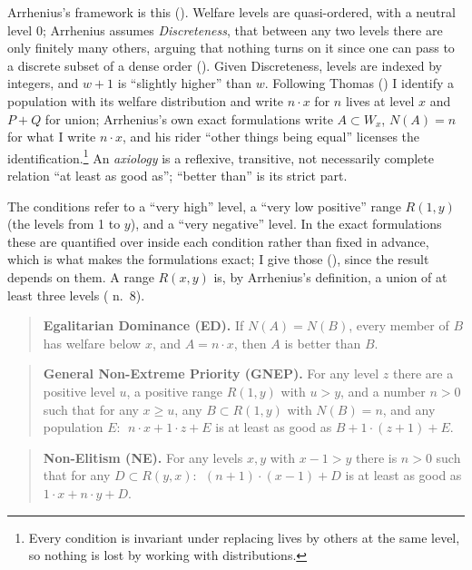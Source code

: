 \documentclass[
  11pt,
  letterpaper,
  DIV=11,
  numbers=noendperiod,
  twoside]{scrartcl}
\begin{document}
Arrhenius's framework is this (). Welfare levels are quasi-ordered, with a neutral level 0;
Arrhenius assumes \emph{Discreteness}, that between any two levels there
are only finitely many others, arguing that nothing turns on it since
one can pass to a discrete subset of a dense order
(). Given Discreteness,
levels are indexed by integers, and \(w+1\) is ``slightly higher'' than
\(w\). Following Thomas () I identify a
population with its welfare distribution and write \(n \cdot x\) for
\(n\) lives at level \(x\) and \(P + Q\) for union; Arrhenius's own
exact formulations write \(A \subset W_x\), \(N(A) = n\) for what I
write \(n \cdot x\), and his rider ``other things being equal'' licenses
the identification.\footnote{Every condition is invariant under
  replacing lives by others at the same level, so nothing is lost by
  working with distributions.} An \emph{axiology} is a reflexive,
transitive, not necessarily complete relation ``at least as good as'';
``better than'' is its strict part.

The conditions refer to a ``very high'' level, a ``very low positive''
range \(R(1,y)\) (the levels from 1 to \(y\)), and a ``very negative''
level. In the exact formulations these are quantified over inside each
condition rather than fixed in advance, which is what makes the
formulations exact; I give those (), since the result depends on them. A range \(R(x,y)\) is,
by Arrhenius's definition, a union of at least three levels
( n.~8).

\begin{quote}
\textbf{Egalitarian Dominance (ED).} If \(N(A) = N(B)\), every member of
\(B\) has welfare below \(x\), and \(A = n \cdot x\), then \(A\) is
better than \(B\).
\end{quote}

\begin{quote}
\textbf{General Non-Extreme Priority (GNEP).} For any level \(z\) there
are a positive level \(u\), a positive range \(R(1,y)\) with \(u > y\),
and a number \(n > 0\) such that for any \(x \geq u\), any
\(B \subset R(1,y)\) with \(N(B) = n\), and any population \(E\):
\(\;n \cdot x + 1\cdot z + E\) is at least as good as
\(B + 1 \cdot (z+1) + E\).
\end{quote}

\begin{quote}
\textbf{Non-Elitism (NE).} For any levels \(x, y\) with \(x - 1 > y\)
there is \(n > 0\) such that for any \(D \subset R(y, x)\):
\(\;(n+1) \cdot (x-1) + D\) is at least as good as
\(1 \cdot x + n \cdot y + D\).
\end{quote}
\end{document}
